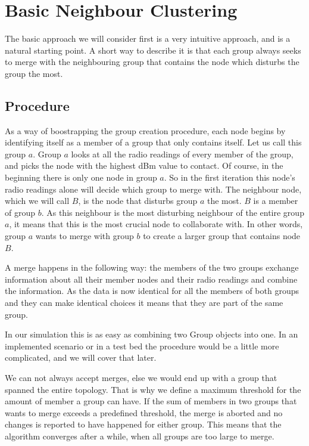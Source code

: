 \section{Basic Neighbour Clustering}
The basic approach we will consider first is a very intuitive approach, and is a natural starting point. A short way to describe it is that each group always seeks
to merge with the neighbouring group that contains the node which disturbs the group the most. 

\subsection{Procedure}
As a way of boostrapping the group creation procedure, each node begins by identifying itself as a member of a group that only contains itself. 
Let us call this group $a$. Group $a$ looks at all the radio readings of every member of the group, and picks the node with the highest dBm value
to contact. Of course, in the beginning there is only one node in group $a$. So in the first iteration this node's radio readings alone will decide which group to merge with. 
The neighbour node, which we will call $B$, is the node that disturbs group $a$ the most. $B$ is a member of group $b$.
As this neighbour is the most disturbing neighbour of the entire group $a$, it means that this is the most crucial node to collaborate with.
In other words, group $a$ wants to merge with group $b$ to create a larger group that contains node $B$.

A merge happens in the following way: the members of the two groups exchange information about all their member nodes and their radio readings and combine the information.
As the data is now identical for all the members of both groups and they can make identical choices it means that they are part of the same group. 

In our simulation this is as easy as combining two Group objects into one. In an implemented scenario or in a test bed the procedure would be a little more complicated, and
we will cover that later. 

We can not always accept merges, else we would end up with a group that spanned the entire topology. That is why we define a maximum threshold for the amount of member a group can have.
If the sum of members in two groups that wants to merge exceeds a predefined threshold, the merge is aborted and no changes is reported to have happened for either group. 
This means that the algorithm converges after a while, when all groups are too large to merge.
 
